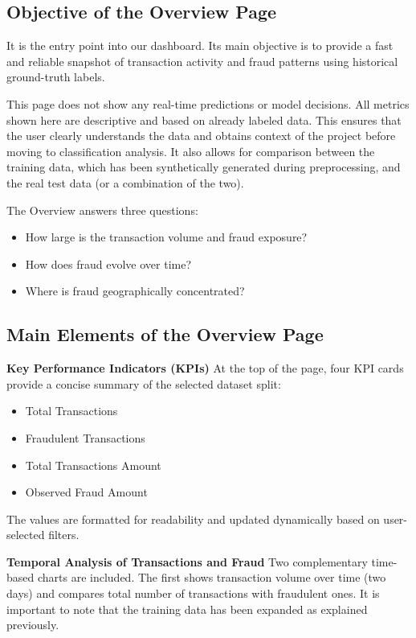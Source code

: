 \documentclass[12pt,a4paper]{report}
\begin{document}
    \subsection{Objective of the Overview Page}

It is the entry point into our dashboard. Its main objective is to provide a fast and reliable snapshot of transaction activity and fraud patterns using historical ground-truth labels.

This page does not show any real-time predictions or model decisions. All metrics shown here are descriptive and based on already labeled data. This ensures that the user clearly understands the data and obtains context of the project before moving to classification analysis. It also allows for comparison between the training data, which has been synthetically generated during preprocessing, and the real test data (or a combination of the two).

The Overview answers three questions: 
\begin{itemize}
    \item How large is the transaction volume and fraud exposure?
    \item How does fraud evolve over time?
    \item Where is fraud geographically concentrated?
\end{itemize}

\subsection{Main Elements of the Overview Page}
    
\textbf{Key Performance Indicators (KPIs)}
At the top of the page, four KPI cards provide a concise summary of the selected dataset split:

\begin{itemize}
    \item Total Transactions
    \item Fraudulent Transactions
    \item Total Transactions Amount
    \item Observed Fraud Amount
\end{itemize}

The values are formatted for readability and updated dynamically based on user-selected filters.

\textbf{Temporal Analysis of Transactions and Fraud}
Two complementary time-based charts are included. The first shows transaction volume over time (two days) and compares total number of transactions with fraudulent ones. It is important to note that the training data has been expanded as explained previously.
\end{document}

